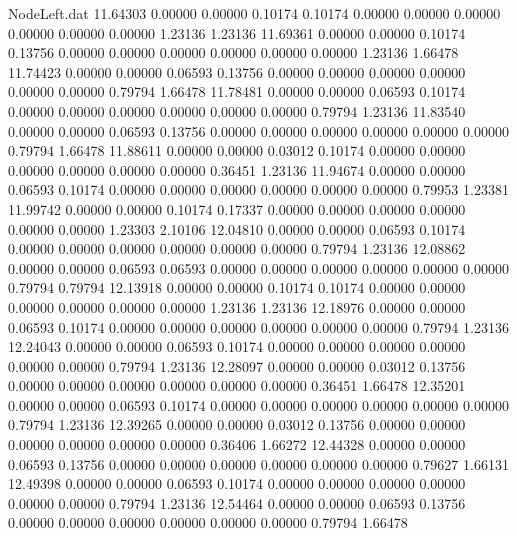 \begin{filecontents}{NodeLeft.dat}
  11.64303    0.00000    0.00000     0.10174    0.10174    0.00000    0.00000    0.00000    0.00000    0.00000    0.00000    1.23136    1.23136
  11.69361    0.00000    0.00000     0.10174    0.13756    0.00000    0.00000    0.00000    0.00000    0.00000    0.00000    1.23136    1.66478
  11.74423    0.00000    0.00000     0.06593    0.13756    0.00000    0.00000    0.00000    0.00000    0.00000    0.00000    0.79794    1.66478
  11.78481    0.00000    0.00000     0.06593    0.10174    0.00000    0.00000    0.00000    0.00000    0.00000    0.00000    0.79794    1.23136
  11.83540    0.00000    0.00000     0.06593    0.13756    0.00000    0.00000    0.00000    0.00000    0.00000    0.00000    0.79794    1.66478
  11.88611    0.00000    0.00000     0.03012    0.10174    0.00000    0.00000    0.00000    0.00000    0.00000    0.00000    0.36451    1.23136
  11.94674    0.00000    0.00000     0.06593    0.10174    0.00000    0.00000    0.00000    0.00000    0.00000    0.00000    0.79953    1.23381
  11.99742    0.00000    0.00000     0.10174    0.17337    0.00000    0.00000    0.00000    0.00000    0.00000    0.00000    1.23303    2.10106
  12.04810    0.00000    0.00000     0.06593    0.10174    0.00000    0.00000    0.00000    0.00000    0.00000    0.00000    0.79794    1.23136
  12.08862    0.00000    0.00000     0.06593    0.06593    0.00000    0.00000    0.00000    0.00000    0.00000    0.00000    0.79794    0.79794
  12.13918    0.00000    0.00000     0.10174    0.10174    0.00000    0.00000    0.00000    0.00000    0.00000    0.00000    1.23136    1.23136
  12.18976    0.00000    0.00000     0.06593    0.10174    0.00000    0.00000    0.00000    0.00000    0.00000    0.00000    0.79794    1.23136
  12.24043    0.00000    0.00000     0.06593    0.10174    0.00000    0.00000    0.00000    0.00000    0.00000    0.00000    0.79794    1.23136
  12.28097    0.00000    0.00000     0.03012    0.13756    0.00000    0.00000    0.00000    0.00000    0.00000    0.00000    0.36451    1.66478
  12.35201    0.00000    0.00000     0.06593    0.10174    0.00000    0.00000    0.00000    0.00000    0.00000    0.00000    0.79794    1.23136
  12.39265    0.00000    0.00000     0.03012    0.13756    0.00000    0.00000    0.00000    0.00000    0.00000    0.00000    0.36406    1.66272
  12.44328    0.00000    0.00000     0.06593    0.13756    0.00000    0.00000    0.00000    0.00000    0.00000    0.00000    0.79627    1.66131
  12.49398    0.00000    0.00000     0.06593    0.10174    0.00000    0.00000    0.00000    0.00000    0.00000    0.00000    0.79794    1.23136
  12.54464    0.00000    0.00000     0.06593    0.13756    0.00000    0.00000    0.00000    0.00000    0.00000    0.00000    0.79794    1.66478

\end{filecontents}
